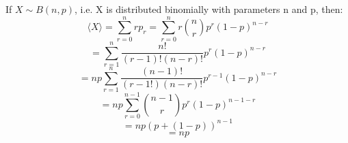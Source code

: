 If $X \sim B(n,p)$, i.e. X is distributed binomially with parameters n and p,
then:
\[ \langle X \rangle = 
\sum _{r=0} ^{n} rp_{r}
= \sum _{r=0} ^{n} r
{n \choose r} p ^ {r}
(1- p ) ^ { n-r} \]
\[ = \sum _{r=1} ^{n} \frac{n!}{(r-1)!(n-r)!}
p^{r} (1-p)^{n-r} \]
\[ = np \sum _{r=1} ^ {n}
\frac{(n-1)!}{(r-1!)(n-r)!}
p^{r-1} (1-p) ^ {n-r} \]
\[ = np \sum _{r=0} ^ { n-1} 
{{n-1} \choose r} p^{r}
(1-p)^ {n-1-r} \]
\[ = np(p+(1-p))^{n-1} \]
\[ = np \]